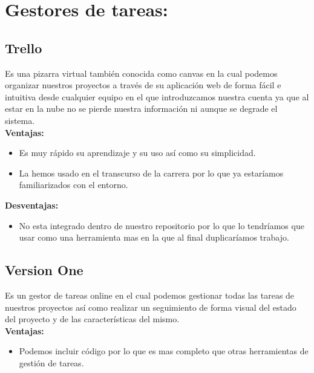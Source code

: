 


\section{Gestores de tareas:}
\subsection{Trello}
Es una pizarra virtual también conocida como canvas en la cual podemos organizar nuestros proyectos a través de su aplicación web de forma fácil e intuitiva desde cualquier equipo en el que introduzcamos nuestra cuenta ya que al estar en la nube no se pierde nuestra información ni aunque se degrade el sistema.
\\

\textbf{Ventajas:}

\begin{itemize}
\item Es muy rápido su aprendizaje y su uso así como su simplicidad.

\item La hemos usado en el transcurso de la carrera por lo que ya estaríamos familiarizados con el entorno.
\end{itemize}

\textbf{Desventajas:}

\begin{itemize}
\item No esta integrado dentro de nuestro repositorio por lo que lo tendríamos que usar como una herramienta mas en la que al final duplicaríamos trabajo.
\end{itemize}


\subsection{Version One}
Es un gestor de tareas online en el cual podemos gestionar todas las tareas de nuestros proyectos así como realizar un seguimiento de forma visual del estado del proyecto y de las características del mismo. 
\\

\textbf{Ventajas:}

\begin{itemize}
\item Podemos incluir código por lo que es mas completo que otras herramientas de gestión de tareas.
\end{itemize}

